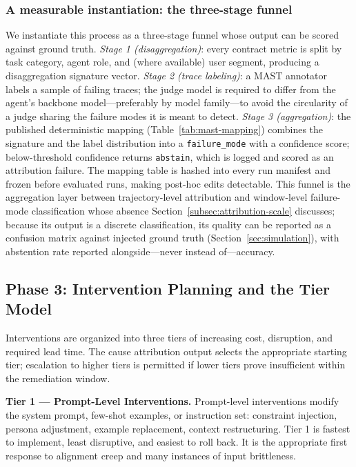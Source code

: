 \subsubsection{A measurable instantiation: the three-stage funnel}
\label{subsubsec:funnel}

We instantiate this process as a three-stage funnel whose output can be scored
against ground truth. \emph{Stage 1 (disaggregation)}: every contract metric is
split by task category, agent role, and (where available) user segment,
producing a disaggregation signature vector. \emph{Stage 2 (trace labeling)}: a
MAST annotator~\cite{cemri2025mast} labels a sample of failing traces; the
judge model is required to differ from the agent's backbone model---preferably
by model family---to avoid the circularity of a judge sharing the failure modes
it is meant to detect. \emph{Stage 3 (aggregation)}: the published
deterministic mapping (Table~\ref{tab:mast-mapping}) combines the signature
and the label distribution into a \texttt{failure\_mode} with a confidence
score; below-threshold confidence returns \texttt{abstain}, which is logged
and scored as an attribution failure. The mapping table is hashed into every
run manifest and frozen before evaluated runs, making post-hoc edits
detectable. This funnel is the aggregation layer between trajectory-level
attribution and window-level failure-mode classification whose absence
Section~\ref{subsec:attribution-scale} discusses; because its output is a
discrete classification, its quality can be reported as a confusion matrix
against injected ground truth (Section~\ref{sec:simulation}), with abstention
rate reported alongside---never instead of---accuracy.

\subsection{Phase 3: Intervention Planning and the Tier Model}
\label{subsec:tiers}

Interventions are organized into three tiers of increasing cost, disruption,
and required lead time. The cause attribution output selects the appropriate
starting tier; escalation to higher tiers is permitted if lower tiers prove
insufficient within the remediation window.

\textbf{Tier 1 --- Prompt-Level Interventions.} Prompt-level interventions
modify the system prompt, few-shot examples, or instruction set: constraint
injection, persona adjustment, example replacement, context restructuring.
Tier 1 is fastest to implement, least disruptive, and easiest to roll back. It
is the appropriate first response to alignment creep and many instances of
input brittleness.

